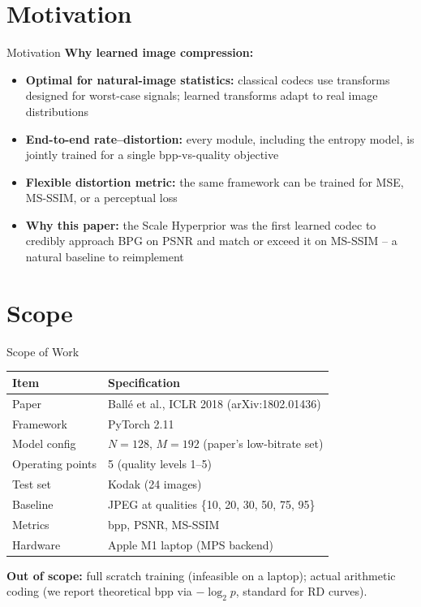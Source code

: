 \documentclass[aspectratio=169, 12pt]{beamer}
\begin{document}
\section{Motivation}

\begin{frame}{Motivation}
    \textbf{Why learned image compression:}
    \vspace{0.3cm}
    \begin{itemize}
        \setlength\itemsep{1.0em}
        \item \textbf{Optimal for natural-image statistics:} classical codecs use transforms designed for worst-case signals; learned transforms adapt to real image distributions
        \item \textbf{End-to-end rate--distortion:} every module, including the entropy model, is jointly trained for a single bpp-vs-quality objective
        \item \textbf{Flexible distortion metric:} the same framework can be trained for MSE, MS-SSIM, or a perceptual loss
        \item \textbf{Why this paper:} the Scale Hyperprior was the first learned codec to credibly approach BPG on PSNR and match or exceed it on MS-SSIM -- a natural baseline to reimplement
    \end{itemize}
\end{frame}

\section{Scope}

\begin{frame}{Scope of Work}
    \centering
    \begin{table}
    \renewcommand{\arraystretch}{1.25}
    \begin{tabular}{l l}
        \toprule
        \textbf{Item} & \textbf{Specification} \\
        \midrule
        Paper & Ball\'e et al., ICLR 2018 (arXiv:1802.01436) \\
        Framework & PyTorch 2.11 \\
        Model config & $N=128$, $M=192$ (paper's low-bitrate set) \\
        Operating points & 5 (quality levels 1--5) \\
        Test set & Kodak (24 images) \\
        Baseline & JPEG at qualities \{10, 20, 30, 50, 75, 95\} \\
        Metrics & bpp, PSNR, MS-SSIM \\
        Hardware & Apple M1 laptop (MPS backend) \\
        \bottomrule
    \end{tabular}
    \end{table}

    \vspace{0.3cm}
    \small\textbf{Out of scope:} full scratch training (infeasible on a laptop); actual arithmetic coding (we report theoretical bpp via $-\log_2 p$, standard for RD curves).
\end{frame}
\end{document}
